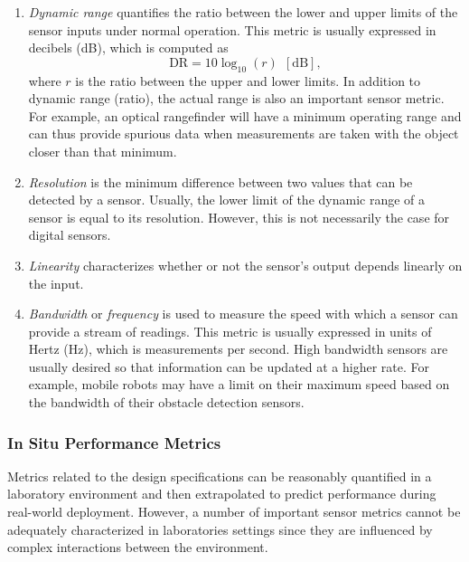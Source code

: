 \begin{enumerate}
    \item \textit{Dynamic range} quantifies the ratio between the lower and upper limits of the sensor inputs under normal operation. This metric is usually expressed in decibels (dB), which is computed as
    \begin{equation*}
        \text{DR} = 10 \log_{10}(r) \:\:[\text{dB}],
    \end{equation*}
    where $r$ is the ratio between the upper and lower limits. In addition to dynamic range (ratio), the actual range is also an important sensor metric. For example, an optical rangefinder will have a minimum operating range and can thus provide spurious data when measurements are taken with the object closer than that minimum.
    \item \textit{Resolution} is the minimum difference between two values that can be detected by a sensor. Usually, the lower limit of the dynamic range of a sensor is equal to its resolution. However, this is not necessarily the case for digital sensors.
    \item \textit{Linearity} characterizes whether or not the sensor's output depends linearly on the input.
    \item \textit{Bandwidth} or \textit{frequency} is used to measure the speed with which a sensor can provide a stream of readings. This metric is usually expressed in units of Hertz (Hz), which is measurements per second. High bandwidth sensors are usually desired so that information can be updated at a higher rate. For example, mobile robots may have a limit on their maximum speed based on the bandwidth of their obstacle detection sensors.
\end{enumerate}



\subsubsection{In Situ Performance Metrics} 
Metrics related to the design specifications can be reasonably quantified in a laboratory environment and then extrapolated to predict performance during real-world deployment. However, a number of important sensor metrics cannot be adequately characterized in laboratories settings since they are influenced by complex interactions between the environment. 

